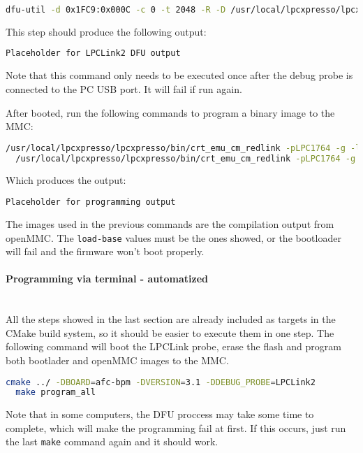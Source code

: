 \documentclass[letterpaper,12pt, titlepage]{article}
\newcommand{\newparagraph}[1]{\paragraph{#1}\mbox{}\\}
\begin{document}
\begin{lstlisting}[language=bash]
  dfu-util -d 0x1FC9:0x000C -c 0 -t 2048 -R -D /usr/local/lpcxpresso/lpcxpresso/bin/LPC432x_CMSIS_DAP_V5_173.bin.hdr
\end{lstlisting}

This step should produce the following output:

\begin{lstlisting}[language=bash]
  Placeholder for LPCLink2 DFU output
\end{lstlisting}

Note that this command only needs to be executed once after the debug probe is connected to the PC USB port. It will fail if run again.

After booted, run the following commands to program a binary image to the MMC:

\begin{lstlisting}[language=bash]
  /usr/local/lpcxpresso/lpcxpresso/bin/crt_emu_cm_redlink -pLPC1764 -g -load-base=0 -flash-load-exec=bootloader.bin
  /usr/local/lpcxpresso/lpcxpresso/bin/crt_emu_cm_redlink -pLPC1764 -g -load-base=0x2000 -flash-load-exec=openMMC.bin
\end{lstlisting}

Which produces the output:

\begin{lstlisting}[language=bash]
  Placeholder for programming output
\end{lstlisting}

The images used in the previous commands are the compilation output from openMMC. The \texttt{load-base} values must be the ones showed, or the bootloader will fail and the firmware won't boot properly.

\newparagraph{Programming via terminal - automatized}
All the steps showed in the last section are already included as targets in the CMake build system, so it should be easier to execute them in one step. The following command will boot the LPCLink probe, erase the flash and program both bootlader and openMMC images to the MMC.

\begin{lstlisting}[language=bash]
  cmake ../ -DBOARD=afc-bpm -DVERSION=3.1 -DDEBUG_PROBE=LPCLink2
  make program_all
\end{lstlisting}

Note that in some computers, the DFU proccess may take some time to complete, which will make the programming fail at first. If this occurs, just run the last \texttt{make} command again and it should work.
\end{document}
